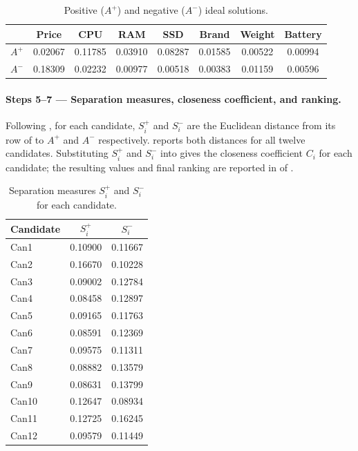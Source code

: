 \begin{table}[htbp]
  \centering
  \caption{Positive ($A^{+}$) and negative ($A^{-}$) ideal solutions.}
  \label{tab:topsis-ideal}
  \begin{tabular}{@{}lccccccc@{}}
    \toprule
     & \textbf{Price} & \textbf{CPU} & \textbf{RAM} & \textbf{SSD} & \textbf{Brand} & \textbf{Weight} & \textbf{Battery} \\
    \midrule
    $A^{+}$ & 0.02067 & 0.11785 & 0.03910 & 0.08287 & 0.01585 & 0.00522 & 0.00994 \\
    $A^{-}$ & 0.18309 & 0.02232 & 0.00977 & 0.00518 & 0.00383 & 0.01159 & 0.00596 \\
    \bottomrule
  \end{tabular}
\end{table}

\paragraph{Steps 5--7 --- Separation measures, closeness coefficient, and ranking.}
Following , for each candidate, $S_i^{+}$ and $S_i^{-}$ are the Euclidean
distance from its row of  to $A^{+}$ and $A^{-}$ respectively.
 reports both distances for all twelve candidates. Substituting
$S_i^{+}$ and $S_i^{-}$ into  gives the closeness coefficient $C_i$ for
each candidate; the resulting values and final ranking are reported in
 of .

\begin{table}[htbp]
  \centering
  \caption{Separation measures $S_i^{+}$ and $S_i^{-}$ for each candidate.}
  \label{tab:topsis-separation}
  \begin{tabular}{@{}lcc@{}}
    \toprule
    Candidate & $S_i^{+}$ & $S_i^{-}$ \\
    \midrule
    Can1  & 0.10900 & 0.11667 \\
    Can2  & 0.16670 & 0.10228 \\
    Can3  & 0.09002 & 0.12784 \\
    Can4  & 0.08458 & 0.12897 \\
    Can5  & 0.09165 & 0.11763 \\
    Can6  & 0.08591 & 0.12369 \\
    Can7  & 0.09575 & 0.11311 \\
    Can8  & 0.08882 & 0.13579 \\
    Can9  & 0.08631 & 0.13799 \\
    Can10 & 0.12647 & 0.08934 \\
    Can11 & 0.12725 & 0.16245 \\
    Can12 & 0.09579 & 0.11449 \\
    \bottomrule
  \end{tabular}
\end{table}
